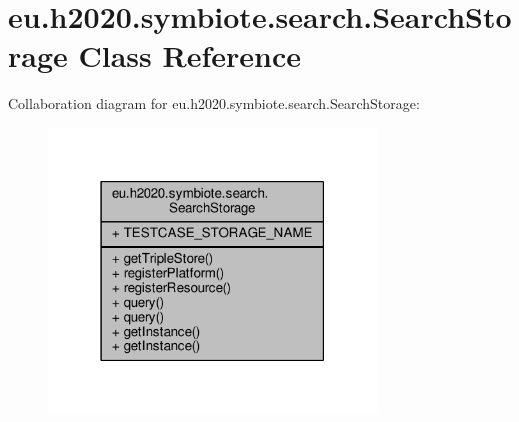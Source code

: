 \hypertarget{classeu_1_1h2020_1_1symbiote_1_1search_1_1SearchStorage}{}\section{eu.\+h2020.\+symbiote.\+search.\+Search\+Storage Class Reference}
\label{classeu_1_1h2020_1_1symbiote_1_1search_1_1SearchStorage}


Collaboration diagram for eu.\+h2020.\+symbiote.\+search.\+Search\+Storage\+:
\nopagebreak
\begin{figure}[H]
\begin{center}
\leavevmode
\includegraphics[width=247pt]{classeu_1_1h2020_1_1symbiote_1_1search_1_1SearchStorage__coll__graph}
\end{center}
\end{figure}
